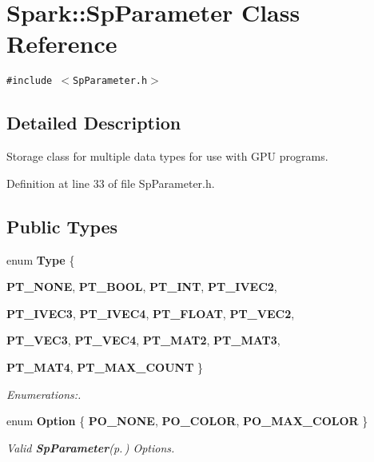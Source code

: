 \section{Spark::Sp\-Parameter Class Reference}
\label{classSpark_1_1SpParameter}
{\tt \#include $<$Sp\-Parameter.h$>$}



\subsection{Detailed Description}
Storage class for multiple data types for use with GPU programs. 

Definition at line 33 of file Sp\-Parameter.h.\subsection*{Public Types}
\begin{CompactItemize}
\item 
enum {\bf Type} \{ \par
{\bf PT\_\-NONE}, 
{\bf PT\_\-BOOL}, 
{\bf PT\_\-INT}, 
{\bf PT\_\-IVEC2}, 
\par
{\bf PT\_\-IVEC3}, 
{\bf PT\_\-IVEC4}, 
{\bf PT\_\-FLOAT}, 
{\bf PT\_\-VEC2}, 
\par
{\bf PT\_\-VEC3}, 
{\bf PT\_\-VEC4}, 
{\bf PT\_\-MAT2}, 
{\bf PT\_\-MAT3}, 
\par
{\bf PT\_\-MAT4}, 
{\bf PT\_\-MAX\_\-COUNT}
 \}
\begin{CompactList}\small\item\em Enumerations:. \item\end{CompactList}\item 
enum {\bf Option} \{ {\bf PO\_\-NONE}, 
{\bf PO\_\-COLOR}, 
{\bf PO\_\-MAX\_\-COLOR}
 \}
\begin{CompactList}\small\item\em Valid {\bf Sp\-Parameter}{\rm (p.\,\pageref{classSpark_1_1SpParameter})} Options. \item\end{CompactList}\end{CompactItemize}
